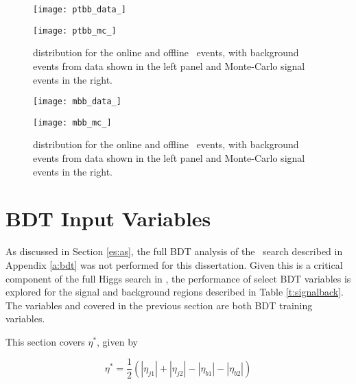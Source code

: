 		\begin{figure}[h]
			\centering
			\begin{minipage}[h]{0.48\linewidth}
				\texttt{[image: ptbb\_data\_]}
			\end{minipage}
			\quad
			\begin{minipage}[h]{0.48\linewidth}
				\texttt{[image: ptbb\_mc\_]}
			\end{minipage}
			\label{f:ptbb}
			\caption[Comparison of the \ptbb distribution of the \VBFHBB\ events for HLT and offline objects]{\ptbb distribution for the online and offline \VBFHBB\ events, with background events from data shown in the left panel and Monte-Carlo signal events in the right.}
		\end{figure}

		\begin{figure}[h]
			\centering
			\begin{minipage}[h]{0.48\linewidth}
				\texttt{[image: mbb\_data\_]}
			\end{minipage}
			\quad
			\begin{minipage}[h]{0.48\linewidth}
				\texttt{[image: mbb\_mc\_]}
			\end{minipage}
			\label{f:mbb}
			\caption[Comparison of the \mbb distribution of the \VBFHBB\ events for HLT and offline objects]{\mbb distribution for the online and offline \VBFHBB\ events, with background events from data shown in the left panel and Monte-Carlo signal events in the right.}
		\end{figure}


\section{BDT Input Variables}

	As discussed in Section \ref{es:as}, the full BDT analysis of the \VBFHBB\ search described in Appendix \ref{a:bdt} was not performed for this dissertation. Given this is a critical component of the full Higgs search \cite{VBFHbb8tev} in \VBFHBB, the performance of select BDT variables is explored for the signal and background regions described in Table \ref{t:signalback}. The variables \mjj and \ptjj covered in the previous section are both BDT training variables.

	This section covers $\eta^*$, given by

	\begin{equation}
	\eta^* = \frac{1}{2}(|\eta_{j1}| + |\eta_{j2}| - |\eta_{b1}| - |\eta_{b2}|)
	\end{equation}

